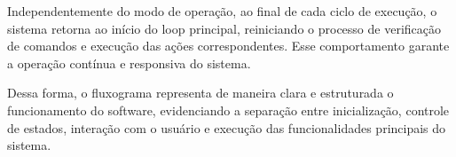 Independentemente do modo de operação, ao final de cada ciclo de execução, o sistema retorna ao início do loop principal, reiniciando o processo de verificação de comandos e execução das ações correspondentes. Esse comportamento garante a operação contínua e responsiva do sistema.

Dessa forma, o fluxograma representa de maneira clara e estruturada o funcionamento do software, evidenciando a separação entre inicialização, controle de estados, interação com o usuário e execução das funcionalidades principais do sistema.
